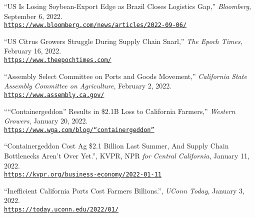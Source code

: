 \documentclass[11 pt,letterpaper]{article}
\renewenvironment{itemize}{
	\begin{list}{}{
			\setlength{\leftmargin}{1.5em}
		}
	}{
	\end{list}
}
\begin{document}
\begin{itemize}
	
		
\item[-] ``US Is Losing Soybean-Export Edge as Brazil Closes Logistics Gap,'' \textit{Bloomberg}, September 6, 2022.     \\	\href{https://www.bloomberg.com/news/articles/2022-09-06/us-losing-soybean-export-edge-as-brazil-closes-logistics-gap?leadSource=uverify%20wall}{\texttt{https://www.bloomberg.com/news/articles/2022-09-06/}}



	\item[-] ``US Citrus Growers Struggle During Supply Chain Snarl,'' \textit{The Epoch Times}, February 16, 2022.     \\	\href{https://www.theepochtimes.com/u-s-citrus-growers-struggle-during-supply-chain-snarl_4283693.html}{\texttt{https://www.theepochtimes.com/}}
	
	
	
	
	\item[-] ``Assembly Select Committee on Ports and Goods Movement,'' \textit{California State Assembly	Committee on Agriculture}, February 2, 2022.     \\	\href{https://www.assembly.ca.gov/sites/assembly.ca.gov/files/ag_export_briefing_document_final.pdf}{\texttt{https://www.assembly.ca.gov/}}
	
	
	
	\item[-] ````Containergeddon'' Results in \$2.1B Loss to California Farmers,'' \textit{Western Growers}, January 20, 2022.     \\	\href{https://www.wga.com/blog/“containergeddon”-results-21b-loss-california-farmers}{\texttt{https://www.wga.com/blog/“containergeddon”}}
	
	
	\item[-] ``Containergeddon Cost Ag \$2.1 Billion Last Summer, And Supply Chain Bottlenecks Aren’t Over Yet.'', KVPR, NPR \textit{for Central California}, January 11, 2022.     \\  
	\href{https://kvpr.org/business-economy/2022-01-11/containergeddon-cost-ag-2- 1-billion-last-summer-and-supply-chain-bottlenecks-arent-over-yet}{\texttt{https://kvpr.org/business-economy/2022-01-11}}
	
	
	
	
		
	\item[-] ``Inefficient California Ports Cost Farmers Billions.'', \textit{UConn Today}, January 3, 2022.     \\	\href{https://today.uconn.edu/2022/01/inefficient-california-ports-cost-farmers-billions/}{\texttt{https://today.uconn.edu/2022/01/}}
	
	
	
	

	
	
\end{itemize}
 
\end{document}
